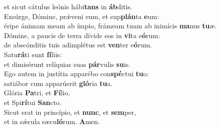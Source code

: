 \oddverse et sicut cátulus leónis hábi\textbf{tans} in \textbf{áb}ditis.\\
\evenverse Exsúrge, Dómine, prǽveni eum, et sup\textbf{plán}ta \textbf{e}um:~\*\\
\evenverse éripe ánimam meam ab ímpio, frámeam tuam ab inimícis \textbf{ma}nus \textbf{tu}æ.\\
\oddverse Dómine, a paucis de terra dívide eos in \textbf{vi}ta e\textbf{ó}rum:~\*\\
\oddverse de abscónditis tuis adimplétus est \textbf{ven}ter e\textbf{ó}rum.\\
\evenverse Satu\textbf{rá}ti sunt \textbf{fí}liis:~\*\\
\evenverse et dimisérunt relíquias suas \textbf{pár}vulis \textbf{su}is.\\
\oddverse Ego autem in justítia apparébo con\textbf{spé}ctui \textbf{tu}o:~\*\\
\oddverse satiábor cum apparúerit \textbf{gló}ria \textbf{tu}a.\\
\evenverse Glória \textbf{Pa}tri, et \textbf{Fí}lio,~\*\\
\evenverse et Spi\textbf{rí}tui \textbf{San}cto.\\
\oddverse Sicut erat in princípio, et \textbf{nunc}, et \textbf{sem}per,~\*\\
\oddverse et in sǽcula sæcu\textbf{ló}rum. \textbf{A}men.\\
